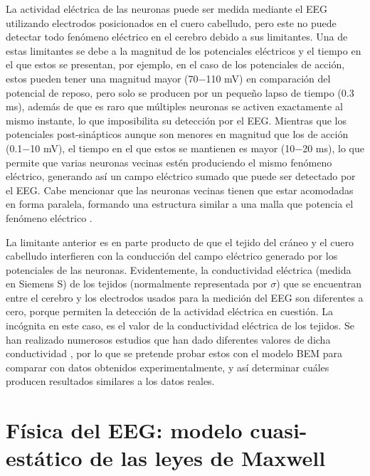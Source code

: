 La actividad eléctrica de las neuronas puede ser medida mediante el EEG utilizando electrodos posicionados en el cuero cabelludo, pero este no puede detectar todo fenómeno eléctrico en el cerebro debido a sus limitantes.
Una de estas limitantes se debe a la magnitud de los potenciales eléctricos y el tiempo en el que estos se presentan, por ejemplo, en el caso de los potenciales de acción, estos pueden tener una magnitud mayor (70$-$110 mV) en comparación del potencial de reposo, pero solo se producen por un pequeño lapso de tiempo (0.3 ms), además de que es raro que múltiples neuronas se activen exactamente al mismo instante, lo que imposibilita su detección por el EEG.
Mientras que los potenciales post-sinápticos aunque son menores en magnitud que los de acción (0.1$-$10 mV), el tiempo en el que estos se mantienen es mayor (10$-$20 ms), lo que permite que varias neuronas vecinas estén produciendo el mismo fenómeno eléctrico, generando así un campo eléctrico sumado que puede ser detectado por el EEG.
Cabe mencionar que las neuronas vecinas tienen que estar acomodadas en forma paralela, formando una estructura similar a una malla que potencia el fenómeno eléctrico \cite{nichollsNeuronBrain2012, Hallez2007}.

La limitante anterior es en parte producto de que el tejido del cráneo y el cuero cabelludo interfieren con la conducción del campo eléctrico generado por los potenciales de las neuronas.
Evidentemente, la conductividad eléctrica (medida en Siemens S) de los tejidos (normalmente representada por $\sigma$) que se encuentran entre el cerebro y los electrodos usados para la medición del EEG son diferentes a cero, porque permiten la detección de la actividad eléctrica en cuestión. La incógnita en este caso, es el valor de la conductividad eléctrica de los tejidos.
Se han realizado numerosos estudios que han dado diferentes valores de dicha conductividad \cite{Gutierrez2004, McCann2019}, por lo que se pretende probar estos con el modelo BEM para comparar con datos obtenidos experimentalmente, y así determinar cuáles producen resultados similares a los datos reales.

\section{Física del EEG: modelo cuasi-estático de las leyes de Maxwell}
\label{sec:intro:physics}

